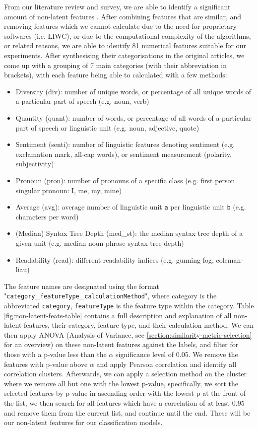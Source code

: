 \documentclass{article}
\begin{document}
 \label{section:non-latent-feat}
From our literature review and survey, we are able to identify a significant amount of non-latent features \cite{zhou2020survey, garg2022linguistic, horne2017}. After combining features that are similar, and removing features which we cannot calculate due to the need for proprietary softwares (i.e. LIWC), or due to the computational complexity of the algorithms, or related reasons, we are able to identify 81 numerical features suitable for our experiments. After synthesising their categorisations in the original articles, we come up with a grouping of 7 main categories (with their abbreviation in brackets), with each feature being able to calculated with a few methods:
\begin{itemize}
  \item Diversity (div): number of unique words, or percentage of all unique words of a particular part of speech (e.g. noun, verb)
  \item Quantity (quant): number of words, or percentage of all words of a particular part of speech or linguistic unit (e.g. noun, adjective, quote)
  \item Sentiment (senti): number of linguistic features denoting sentiment (e.g. exclamation mark, all-cap words), or sentiment measurement (polarity, subjectivity)
  \item Pronoun (pron): number of pronouns of a specific class (e.g. first person singular pronoun: I, me, my, mine)
  \item Average (avg): average number of linguistic unit \texttt{a} per linguistic unit \texttt{b} (e.g. characters per word)
  \item (Median) Syntax Tree Depth (med\_st): the median syntax tree depth of a given unit (e.g. median noun phrase syntax tree depth)
  \item Readability (read): different readability indices (e.g. gunning-fog, coleman-liau)
\end{itemize}

The feature names are designated using the format "\texttt{category}\_\texttt{featureType}\_\texttt{calculationMethod}", where category is the abbreviated \texttt{category}, \texttt{featureType} is the feature type within the category. Table \ref{fig:non-latent-feats-table} contains a full description and explanation of all non-latent features, their category, feature type, and their calculation method. We can then apply ANOVA (Analysis of Variance, see \ref{section:similarity-metric-selection} for an overview) on these non-latent features against the labels, and filter for those with a p-value less than the $\alpha$ significance level of 0.05. We remove the features with p-value above $\alpha$ and apply Pearson correlation and identify all correlation clusters. Afterwards, we can apply a selection method on the cluster where we remove all but one with the lowest p-value, specifically, we sort the selected features by p-value in ascending order with the lowest p at the front of the list, we then search for all features which have a correlation of at least $0.95$ and remove them from the current list, and continue until the end. These will be our non-latent features for our classification models.
\end{document}

